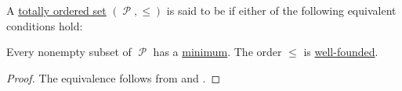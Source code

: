 \begin{definition}\label{def:well_ordered_set}
  A \hyperref[def:totally_ordered_set]{totally ordered set} \( (\mscrP, \leq) \) is said to be  if either of the following equivalent conditions hold:
  \begin{thmenum}
     Every nonempty subset of \( \mscrP \) has a \hyperref[def:poset_extremal_points/maximum_and_minimum]{minimum}.
     The order \( \leq \) is \hyperref[def:well_founded_relation]{well-founded}.
  \end{thmenum}
\end{definition}
\begin{proof}
  The equivalence follows from  and .
\end{proof}

